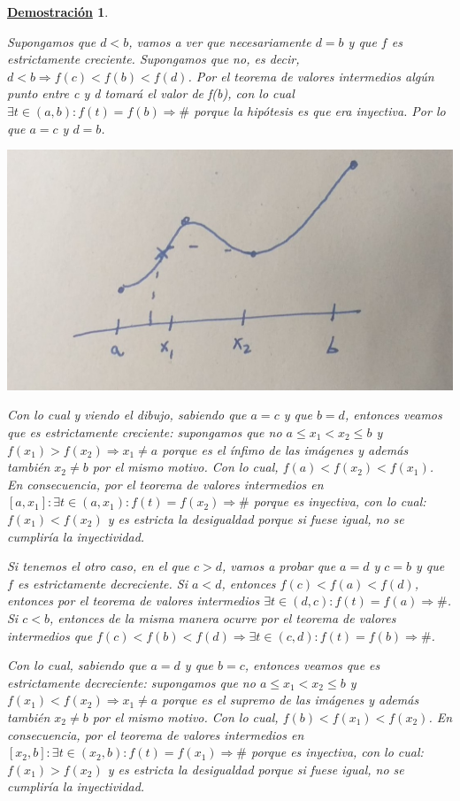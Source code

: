 \documentclass[10pt,a4paper,openright]{book}
\theoremstyle{break}
\newtheorem*{demo}{\underline{Demostración}}
\begin{document}
\begin{demo}
\begin{enumerate}
\begin{itemize}
	Supongamos que $d<b$, vamos a ver que necesariamente $d=b$ y que $f$ es estrictamente creciente. Supongamos que no, es decir, $d<b\Rightarrow f(c)< f(b)< f(d)$. Por el teorema de valores intermedios algún punto entre c y d tomará el valor de f(b), con lo cual $\exists t\in (a,b): f(t)=f(b)\Rightarrow \#$ porque la hipótesis es que era inyectiva. Por lo que $a=c$ y $d=b$.
	
	\begin{center}
	\includegraphics[scale=0.25]{inyectividad a monotonia en continuas1}
	\end{center}
	
	Con lo cual y viendo el dibujo, sabiendo que $a=c$ y que $b=d$, entonces veamos que es estrictamente creciente: supongamos que no $a\leq x_1< x_2 \leq b$ y $f(x_1)>f(x_2)\Rightarrow x_1\neq a$ porque es el ínfimo de las imágenes y además también $x_2\neq b$ por el mismo motivo. Con lo cual, $f(a)< f(x_2)< f(x_1)$. En consecuencia, por el teorema de valores intermedios en $[a,x_1]: \exists t\in (a,x_1): f(t)=f(x_2)\Rightarrow \#$ porque es inyectiva, con lo cual: $f(x_1)<f(x_2)$ y es estricta la desigualdad porque si fuese igual, no se cumpliría la inyectividad.\par
		
	Si tenemos el otro caso, en el que $c>d$, vamos a probar que $a=d$ y $c=b$ y que $f$ es estrictamente decreciente. Si $a<d$, entonces $f(c)<f(a)<f(d)$, entonces por el teorema de valores intermedios $\exists t\in (d,c): f(t)=f(a)\Rightarrow \#$. Si $c<b$, entonces de la misma manera ocurre por el teorema de valores intermedios que $f(c)< f(b)< f(d)\Rightarrow \exists t\in (c,d): f(t)=f(b)\Rightarrow \#$.\par

Con lo cual, sabiendo que $a=d$ y que $b=c$, entonces veamos que es estrictamente decreciente: supongamos que no $a\leq x_1< x_2 \leq b$ y $f(x_1)<f(x_2)\Rightarrow x_1\neq a$ porque es el supremo de las imágenes y además también $x_2\neq b$ por el mismo motivo. Con lo cual, $f(b)< f(x_1)< f(x_2)$. En consecuencia, por el teorema de valores intermedios en $[x_2,b]: \exists t\in (x_2,b): f(t)=f(x_1)\Rightarrow \#$ porque es inyectiva, con lo cual: $f(x_1)>f(x_2)$ y es estricta la desigualdad porque si fuese igual, no se cumpliría la inyectividad.\par
	\end{itemize}
	

\end{enumerate}
\end{demo}
\end{document}

